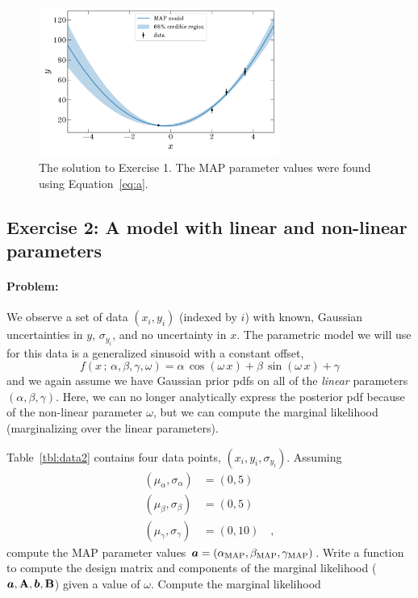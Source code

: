 \begin{figure}[t]
  \centering
  \includegraphics[width=0.7\textwidth]{exercise1.pdf}
  \caption{The solution to Exercise 1. The MAP parameter values were found using
    Equation~\ref{eq:a}.}
  \label{fig:ex1}
\end{figure}


\subsection{Exercise 2: A model with linear and non-linear parameters}

\paragraph{Problem:} We observe a set of data $(x_i, y_i)$ (indexed by $i$) with
known, Gaussian uncertainties in $y$, $\sigma_{y_i}$, and no uncertainty in $x$.
The parametric model we will use for this data is a generalized sinusoid with a
constant offset,
\begin{equation}
  f(x \,;\, \alpha, \beta, \gamma, \omega) =
    \alpha\,\cos(\omega \, x) + \beta\,\sin(\omega \, x) + \gamma
\end{equation}
and we again assume we have Gaussian prior pdfs on all of the \emph{linear}
parameters $(\alpha, \beta, \gamma)$.
Here, we can no longer analytically express the posterior pdf because of the
non-linear parameter $\omega$, but we can compute the marginal likelihood
(marginalizing over the linear parameters).

Table~\ref{tbl:data2} contains four data points, $(x_i, y_i, \sigma_{y_i})$.
Assuming
\begin{align}
  (\mu_\alpha, \sigma_\alpha) &= (0, 5)\\
  (\mu_\beta, \sigma_\beta) &= (0, 5)\\
  (\mu_\gamma, \sigma_\gamma) &= (0, 10) \quad ,
\end{align}
compute the MAP parameter values $\boldsymbol{a} = (\alpha_{\rm MAP}, \beta_{\rm MAP},
\gamma_{\rm MAP})$.
Write a function to compute the design matrix and components of the marginal
likelihood ($\boldsymbol{a}, \mathbf{A}, \boldsymbol{b}, \mathbf{B}$) given a value of $\omega$.
Compute the marginal likelihood

